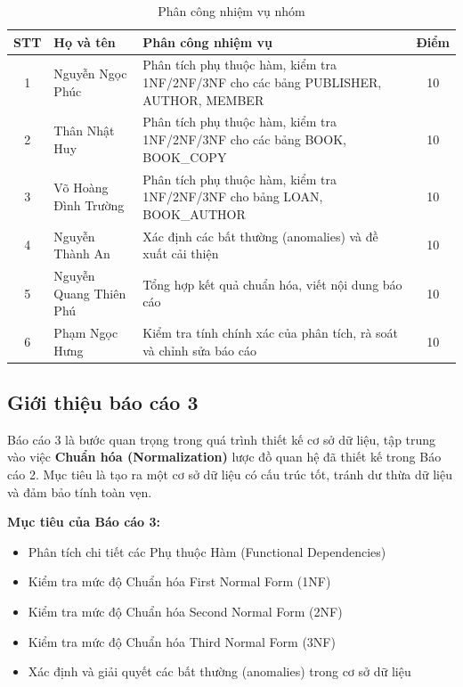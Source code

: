 \documentclass[12pt,a4paper]{article}
\begin{document}
\begin{table}[H]
\centering
\caption{Phân công nhiệm vụ nhóm}
\begin{tabular}{@{}|c|l|p{8cm}|c|@{}}
\hline
\textbf{STT} & \textbf{Họ và tên} & \textbf{Phân công nhiệm vụ} & \textbf{Điểm} \\ \hline
1 & Nguyễn Ngọc Phúc &
Phân tích phụ thuộc hàm, kiểm tra 1NF/2NF/3NF cho các bảng PUBLISHER, AUTHOR, MEMBER &
10 \\ \hline
2 & Thân Nhật Huy &
Phân tích phụ thuộc hàm, kiểm tra 1NF/2NF/3NF cho các bảng BOOK, BOOK\_COPY &
10 \\ \hline
3 & Võ Hoàng Đình Trường &
Phân tích phụ thuộc hàm, kiểm tra 1NF/2NF/3NF cho bảng LOAN, BOOK\_AUTHOR &
10 \\ \hline
4 & Nguyễn Thành An &
Xác định các bất thường (anomalies) và đề xuất cải thiện &
10 \\ \hline
5 & Nguyễn Quang Thiên Phú &
Tổng hợp kết quả chuẩn hóa, viết nội dung báo cáo &
10 \\ \hline
6 & Phạm Ngọc Hưng &
Kiểm tra tính chính xác của phân tích, rà soát và chỉnh sửa báo cáo &
10 \\ \hline
\end{tabular}
\end{table}

\subsection{Giới thiệu báo cáo 3}

Báo cáo 3 là bước quan trọng trong quá trình thiết kế cơ sở dữ liệu, tập trung vào việc \textbf{Chuẩn hóa (Normalization)} lược đồ quan hệ đã thiết kế trong Báo cáo 2. Mục tiêu là tạo ra một cơ sở dữ liệu có cấu trúc tốt, tránh dư thừa dữ liệu và đảm bảo tính toàn vẹn.

\textbf{Mục tiêu của Báo cáo 3:}
\begin{itemize}
    \item Phân tích chi tiết các Phụ thuộc Hàm (Functional Dependencies)
    \item Kiểm tra mức độ Chuẩn hóa First Normal Form (1NF)
    \item Kiểm tra mức độ Chuẩn hóa Second Normal Form (2NF)
    \item Kiểm tra mức độ Chuẩn hóa Third Normal Form (3NF)
    \item Xác định và giải quyết các bất thường (anomalies) trong cơ sở dữ liệu
\end{itemize}
\end{document}
